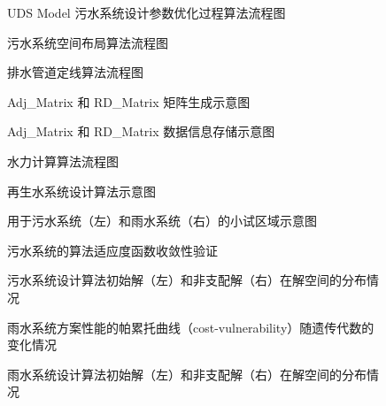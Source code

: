 \documentclass[degree=doctor]{thuthesis}
\begin{document}
\clearpage
\setcounter{page}{101}
\begin{figure}
  \centering
  \caption{UDS Model 污水系统设计参数优化过程算法流程图}
\end{figure}

\clearpage
\setcounter{page}{103}
\begin{figure}
  \centering
  \caption{污水系统空间布局算法流程图}
\end{figure}

\begin{figure}
  \centering
  \caption{排水管道定线算法流程图}
\end{figure}

\begin{figure}
  \centering
  \caption{Adj\_Matrix 和 RD\_Matrix 矩阵生成示意图}
\end{figure}

\clearpage
\setcounter{page}{104}
\begin{figure}
  \centering
  \caption{Adj\_Matrix 和 RD\_Matrix 数据信息存储示意图}
\end{figure}

\begin{figure}
  \centering
  \caption{水力计算算法流程图}
\end{figure}

\begin{figure}
  \centering
  \caption{再生水系统设计算法示意图}
\end{figure}

\clearpage
\setcounter{page}{106}
\begin{figure}
  \centering
  \caption{用于污水系统（左）和雨水系统（右）的小试区域示意图}
\end{figure}

\begin{figure}
  \centering
  \caption{污水系统的算法适应度函数收敛性验证}
\end{figure}

\begin{figure}
  \centering
  \caption{污水系统设计算法初始解（左）和非支配解（右）在解空间的分布情况}
\end{figure}

\clearpage
\setcounter{page}{107}
\begin{figure}
  \centering
  \caption{雨水系统方案性能的帕累托曲线（cost-vulnerability）随遗传代数的变化情况}
\end{figure}

\begin{figure}
  \centering
  \caption{雨水系统设计算法初始解（左）和非支配解（右）在解空间的分布情况}
\end{figure}
\end{document}

